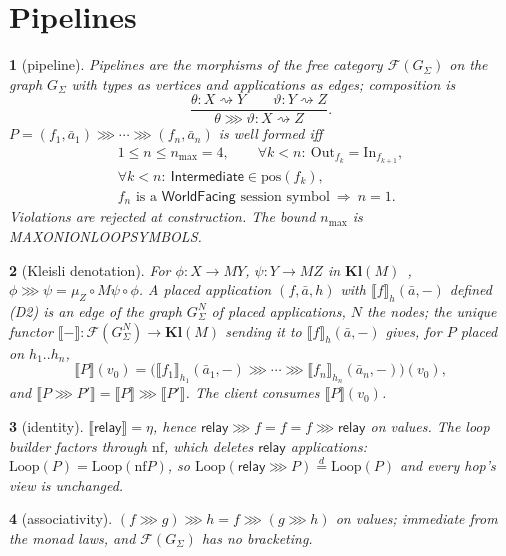 \documentclass[journal]{IEEEtran}
\newcommand{\namedhead}{}
\newtheorem*{namedenv}{\namedhead}
\newenvironment{defD}[2]{\renewcommand{\namedhead}{Definition #1}%
  \begin{namedenv}[#2]}{\end{namedenv}}
\newenvironment{lawL}[2]{\renewcommand{\namedhead}{Law #1}%
  \begin{namedenv}[#2]}{\end{namedenv}}
\newcommand{\sem}[1]{\llbracket #1\rrbracket}
\newcommand{\then}{\mathbin{\ggg}}
\newcommand{\relay}{\mathsf{relay}}
\newcommand{\Int}{\mathsf{Intermediate}}
\newcommand{\WF}{\mathsf{WorldFacing}}
\newcommand{\Kl}{\mathbf{Kl}}
\newcommand{\Free}{\mathcal{F}}
\newcommand{\nf}{\mathrm{nf}}
\newcommand{\LoopOf}{\mathrm{Loop}}
\newcommand{\pos}{\mathrm{pos}}
\newcommand{\In}{\mathrm{In}}
\newcommand{\Out}{\mathrm{Out}}
\newcommand{\eqd}{\overset{d}{=}}
\DeclareRobustCommand{\code}[1]{{\ttfamily\renewcommand{\_}{\textunderscore\allowbreak}#1}}
\begin{document}
\section{Pipelines}\label{sec:pipeline}

\begin{defD}{D4a}{pipeline}
Pipelines are the morphisms of the free category $\Free(G_\Sigma)$ on
the graph $G_\Sigma$ with types as vertices and applications as edges;
composition is
\[
\frac{\theta:X\rightsquigarrow Y\qquad \vartheta:Y\rightsquigarrow Z}
     {\theta\then\vartheta:X\rightsquigarrow Z}.
\]
$P=(f_1,\bar a_1)\then\cdots\then(f_n,\bar a_n)$ is well formed iff
\begin{gather*}
1\le n\le n_{\max}=4,\qquad\forall k<n:\ \Out_{f_k}=\In_{f_{k+1}},\\
\forall k<n:\ \Int\in\pos(f_k),\\
f_n\text{ is a }\WF\text{ session symbol}\ \Rightarrow\ n=1 .
\end{gather*}
Violations are rejected at construction.  The bound $n_{\max}$ is
\code{MAX\_ONION\_LOOP\_SYMBOLS}.
\end{defD}

\begin{defD}{D4b}{Kleisli denotation}
For $\phi:X\to MY$, $\psi:Y\to MZ$ in $\Kl(M)$~\cite{Moggi1991},
$\phi\then\psi=\mu_Z\circ M\psi\circ\phi$.  A placed application
$(f,\bar a,h)$ with $\sem{f}_h(\bar a,-)$ defined (D2) is an edge of the graph $G^N_\Sigma$
of placed applications, $N$ the nodes; the unique functor
$\sem{-}:\Free(G^N_\Sigma)\to\Kl(M)$ sending it to
$\sem{f}_h(\bar a,-)$ gives, for $P$ placed on $h_1..h_n$,
\[
\sem{P}(v_0)=\bigl(\sem{f_1}_{h_1}(\bar a_1,-)\then\cdots\then
\sem{f_n}_{h_n}(\bar a_n,-)\bigr)(v_0),
\]
and $\sem{P\then P'}=\sem{P}\then\sem{P'}$.  The client consumes
$\sem{P}(v_0)$.
\end{defD}

\begin{lawL}{L1}{identity}
$\sem{\relay}=\eta$, hence $\relay\then f=f=f\then\relay$ on values.  The
loop builder factors through $\nf$, which deletes $\relay$ applications:
$\LoopOf(P)=\LoopOf(\nf P)$, so $\LoopOf(\relay\then P)\eqd\LoopOf(P)$ and every
hop's view is unchanged.
\end{lawL}

\begin{lawL}{L2}{associativity}
$(f\then g)\then h=f\then(g\then h)$ on values; immediate from the monad
laws, and $\Free(G_\Sigma)$ has no bracketing.
\end{lawL}
\end{document}
